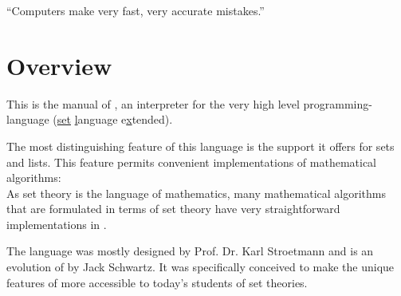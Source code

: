 


\globalDate{\today}







\begin{titlepage}
\maketitle

\vfill

\begin{center}
\Large
``Computers make very fast, very accurate mistakes.''
\end{center}

\vfill
\tableofcontents
\end{titlepage}

\section{Overview}

This is the manual of \setlX, an interpreter for the very high level programming-language \SetlX{} (\underline{set} \underline{l}anguage e\underline{x}tended).

The most distinguishing feature of this language is the support it offers for sets and lists.
This feature permits convenient implementations of mathematical algorithms:\\
As set theory is the language of mathematics, many mathematical algorithms that are formulated in terms of set theory have very straightforward implementations in \SetlX{}.

The \SetlX{} language was mostly designed by Prof. Dr. Karl Stroetmann and is an evolution of \Setl{} by Jack Schwartz.
It was specifically conceived to make the unique features of \Setl{} more accessible to today's students of set theories.

